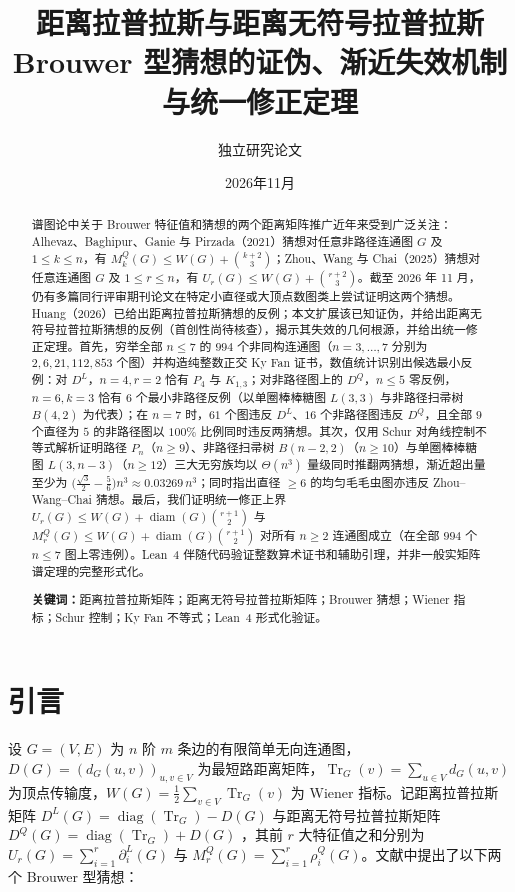 \documentclass[11pt,a4paper]{article}
\title{\textbf{距离拉普拉斯与距离无符号拉普拉斯 Brouwer 型猜想的证伪、渐近失效机制与统一修正定理}}
\author{独立研究论文}
\date{2026年11月}
\theoremstyle{remark}
\DeclareMathOperator{\Tr}{Tr}
\DeclareMathOperator{\diam}{diam}
\DeclareMathOperator{\diag}{diag}
\begin{document}
\maketitle

\begin{abstract}
谱图论中关于 Brouwer 特征值和猜想的两个距离矩阵推广近年来受到广泛关注：Alhevaz、Baghipur、Ganie 与 Pirzada（2021）猜想对任意非路径连通图 $G$ 及 $1 \le k \le n$，有 $M_k^Q(G) \le W(G) + \binom{k+2}{3}$；Zhou、Wang 与 Chai（2025）猜想对任意连通图 $G$ 及 $1 \le r \le n$，有 $U_r(G) \le W(G) + \binom{r+2}{3}$。截至 2026 年 11 月，仍有多篇同行评审期刊论文在特定小直径或大顶点数图类上尝试证明这两个猜想。Huang（2026）已给出距离拉普拉斯猜想的反例；本文扩展该已知证伪，并给出距离无符号拉普拉斯猜想的反例（首创性尚待核查），揭示其失效的几何根源，并给出统一修正定理。首先，穷举全部 $n \le 7$ 的 $994$ 个非同构连通图（$n=3,\dots,7$ 分别为 $2,6,21,112,853$ 个图）并构造纯整数正交 Ky Fan 证书，数值统计识别出候选最小反例：对 $D^L$，$n=4,r=2$ 恰有 $P_4$ 与 $K_{1,3}$；对非路径图上的 $D^Q$，$n\le 5$ 零反例，$n=6,k=3$ 恰有 $6$ 个最小非路径反例（以单圈棒棒糖图 $L(3,3)$ 与非路径扫帚树 $B(4,2)$ 为代表）；在 $n=7$ 时，$61$ 个图违反 $D^L$、$16$ 个非路径图违反 $D^Q$，且全部 $9$ 个直径为 $5$ 的非路径图以 $100\%$ 比例同时违反两猜想。其次，仅用 Schur 对角线控制不等式解析证明路径 $P_n$（$n\ge 9$）、非路径扫帚树 $B(n-2,2)$（$n\ge 10$）与单圈棒棒糖图 $L(3,n-3)$（$n\ge 12$）三大无穷族均以 $\Theta(n^3)$ 量级同时推翻两猜想，渐近超出量至少为 $\bigl(\frac{\sqrt{3}}{2}-\frac{5}{6}\bigr)n^3 \approx 0.03269\,n^3$；同时指出直径 $\ge 6$ 的均匀毛毛虫图亦违反 Zhou--Wang--Chai 猜想。最后，我们证明统一修正上界 $U_r(G)\le W(G)+\diam(G)\binom{r+1}{2}$ 与 $M_r^Q(G)\le W(G)+\diam(G)\binom{r+1}{2}$ 对所有 $n\ge 2$ 连通图成立（在全部 $994$ 个 $n\le 7$ 图上零违例）。Lean~4 伴随代码验证整数算术证书和辅助引理，并非一般实矩阵谱定理的完整形式化。

\medskip
\noindent\textbf{关键词：}距离拉普拉斯矩阵；距离无符号拉普拉斯矩阵；Brouwer 猜想；Wiener 指标；Schur 控制；Ky Fan 不等式；Lean~4 形式化验证。
\end{abstract}

\section{引言}
设 $G=(V,E)$ 为 $n$ 阶 $m$ 条边的有限简单无向连通图，$D(G)=(d_G(u,v))_{u,v\in V}$ 为最短路距离矩阵，$\Tr_G(v)=\sum_{u\in V}d_G(u,v)$ 为顶点传输度，$W(G)=\frac{1}{2}\sum_{v\in V}\Tr_G(v)$ 为 Wiener 指标。记距离拉普拉斯矩阵 $D^L(G)=\diag(\Tr_G)-D(G)$ 与距离无符号拉普拉斯矩阵 $D^Q(G)=\diag(\Tr_G)+D(G)$ \cite{AH2013}，其前 $r$ 大特征值之和分别为 $U_r(G)=\sum_{i=1}^r \partial_i^L(G)$ 与 $M_r^Q(G)=\sum_{i=1}^r \rho_i^Q(G)$。文献中提出了以下两个 Brouwer 型猜想：
\end{document}
